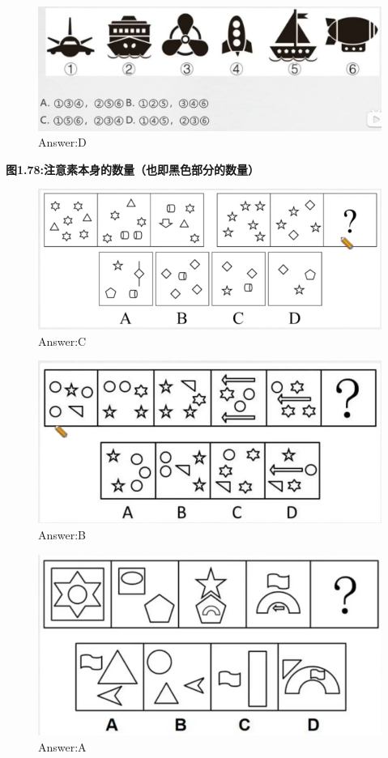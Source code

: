 \documentclass{article}
\numberwithin{equation}{section}						%
\numberwithin{figure}{section}							%
\begin{document}
\begin{sloppypar}
\begin{figure}[H]
     \centering
     \includegraphics[width=0.6\linewidth]{81.png}
		\caption{Answer:D}
\end{figure}

\textbf{图1.78:注意素本身的数量（也即黑色部分的数量）}


\begin{figure}[H]
     \centering
     \includegraphics[width=0.6\linewidth]{82.png}
		\caption{Answer:C}
\end{figure}



\begin{figure}[H]
     \centering
     \includegraphics[width=0.6\linewidth]{83.png}
		\caption{Answer:B}
\end{figure}


\begin{figure}[H]
     \centering
     \includegraphics[width=0.6\linewidth]{84.png}
		\caption{Answer:A}
\end{figure}



\end{sloppypar}
\end{document}

